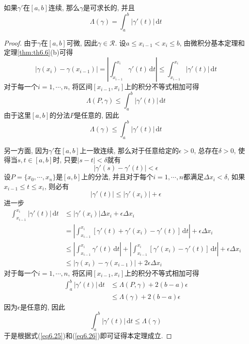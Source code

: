 \documentclass[cn,12pt,math=mtpro2,citestyle=gb7714-2015,bibstyle=gb7714-2015,twocol]{elegantbook}
\newcommand{\dt}{\,\text{d}t}
\begin{document}
\begin{theorem}\label{thm:th6.12}
  如果$\gamma'$在$[a,b]$连续, 那么$\gamma$是可求长的, 并且
  $$\Lambda(\gamma)=\int_{a}^{b}|\gamma'(t)|\dt$$
\end{theorem}
\begin{proof}
  由于$\gamma$在$[a,b]$可微, 因此$\gamma\in\mathscr{R}$. 设$a\leq x_{i-1}<x_i\leq b$, 由微积分基本定理和定理\ref{thm:th6.6}(b)可得
  $$|\gamma(x_i)-\gamma(x_{i-1})|=\left|\int_{x_{i-1}}^{x_i}\gamma'(t)\dt\right|\leq\int_{x_{i-1}}^{x_i}|\gamma'(t)|\dt$$
  对于每一个$i=1,\cdots,n$, 将区间$[x_{i-1},x_i]$上的积分不等式相加可得
  $$\Lambda(P,\gamma)\leq \int_{a}^{b}|\gamma'(t)|\dt$$
  由于这里$[a,b]$的分法$P$是任意的, 因此
  \begin{equation}\label{eq6.25}
   \Lambda(\gamma)\leq \int_{a}^{b}|\gamma'(t)|\dt
  \end{equation}

  另一方面, 因为$\gamma'$在$[a,b]$上一致连续, 那么对于任意给定的$\epsilon>0$, 总存在$\delta>0$, 使得当$s, t\in [a,b]$时, 只要$|s-t|<\delta$就有
  $$|\gamma'(s)-\gamma'(t)|<\epsilon$$
  设$P=\{x_0,\cdots,x_n\}$是$[a,b]$上的分法, 并且对于每个$i=1,\cdots,n$都满足$\Delta x_i<\delta$, 如果$x_{i-1}\leq t\leq x_i$, 则必有
  $$|\gamma'(t)|\leq |\gamma'(x_i)|+\epsilon$$
  进一步
  \begin{align*}
  \int_{x_{i-1}}^{x_i}|\gamma'(t)|\dt&\leq |\gamma'(x_i)|\Delta x_i+\epsilon\Delta x_i \\
  &=\left|\int_{x_{i-1}}^{x_i}[\gamma'(t)+\gamma'(x_i)-\gamma'(t)]\dt\right|+\epsilon\Delta x_i \\
  &\leq \left|\int_{x_{i-1}}^{x_i}\gamma'(t)\dt\right|+\left|\int_{x_{i-1}}^{x_i}[\gamma'(x_i)-\gamma'(t)]\dt\right|+\epsilon\Delta x_i \\
  &\leq |\gamma(x_i)-\gamma(x_{i-1})|+2\epsilon\Delta x_i
  \end{align*}
  对于每一个$i=1,\cdots,n$, 将区间$[x_{i-1},x_i]$上的积分不等式相加可得
  \begin{align*}
  \int_{a}^{b}|\gamma'(t)|\dt&\leq \Lambda(P,\gamma)+2(b-a)\epsilon\\
  &\leq \Lambda(\gamma)+2(b-a)\epsilon
  \end{align*}
  因为$\epsilon$是任意的, 因此
  \begin{equation}\label{eq6.26}
    \int_{a}^{b}|\gamma'(t)|\dt\leq \Lambda(\gamma)
  \end{equation}
  于是根据式(\ref{eq6.25})和(\ref{eq6.26})即可证得本定理成立.


\end{proof}
\end{document}
